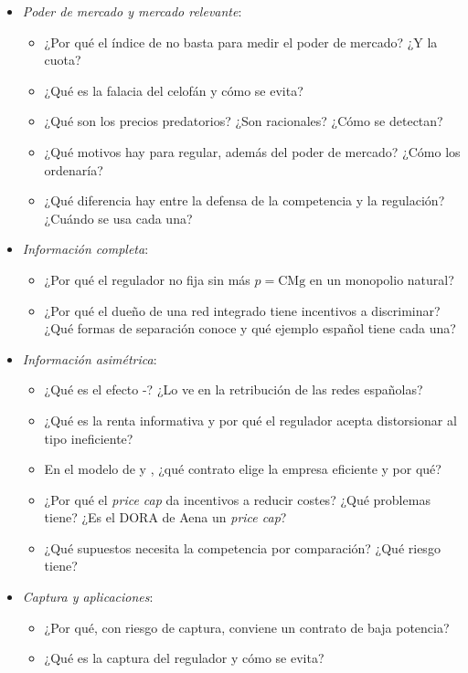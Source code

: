 \documentclass[11pt]{article}
\begin{document}
\begin{itemize}
\item \emph{Poder de mercado y mercado relevante}:
  \begin{itemize}
  \item ¿Por qué el índice de  no basta para medir el poder de mercado? ¿Y la cuota?
  \item ¿Qué es la falacia del celofán y cómo se evita?
  \item ¿Qué son los precios predatorios? ¿Son racionales? ¿Cómo se detectan?
  \item ¿Qué motivos hay para regular, además del poder de mercado? ¿Cómo los ordenaría?
  \item ¿Qué diferencia hay entre la defensa de la competencia y la regulación? ¿Cuándo se usa cada una?
  \end{itemize}
\item \emph{Información completa}:
  \begin{itemize}
  \item ¿Por qué el regulador no fija sin más $p=\mathrm{CMg}$ en un monopolio natural?
  \item ¿Por qué el dueño de una red integrado tiene incentivos a discriminar? ¿Qué formas de separación conoce y qué ejemplo español tiene cada una?
  \end{itemize}
\item \emph{Información asimétrica}:
  \begin{itemize}
  \item ¿Qué es el efecto -? ¿Lo ve en la retribución de las redes españolas?
  \item ¿Qué es la renta informativa y por qué el regulador acepta distorsionar al tipo ineficiente?
  \item En el modelo de  y , ¿qué contrato elige la empresa eficiente y por qué?
  \item ¿Por qué el \emph{price cap} da incentivos a reducir costes? ¿Qué problemas tiene? ¿Es el DORA de Aena un \emph{price cap}?
  \item ¿Qué supuestos necesita la competencia por comparación? ¿Qué riesgo tiene?
  \end{itemize}
\item \emph{Captura y aplicaciones}:
  \begin{itemize}
  \item ¿Por qué, con riesgo de captura, conviene un contrato de baja potencia?
  \item ¿Qué es la captura del regulador y cómo se evita?

\end{itemize}
\end{itemize}
\end{document}
